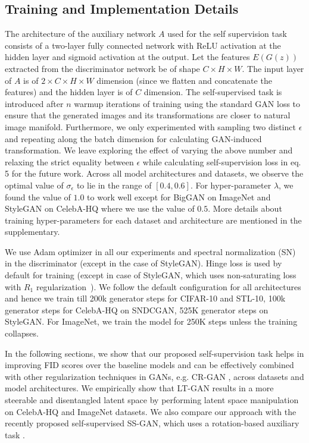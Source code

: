 \documentclass[10pt,twocolumn,letterpaper]{article}
\begin{document}
\subsection{Training and Implementation Details}
The architecture of the auxiliary network $A$ used for the self supervision task consists of a two-layer fully connected network with ReLU activation at the hidden layer and sigmoid activation at the output. Let the features $E(G(z))$ extracted from the discriminator network be of shape $C\times H\times W$. The input layer of $A$ is of $2\times C\times H\times W$ dimension (since we flatten and concatenate the features) and the hidden layer is of $C$ dimension. The self-supervised task is introduced after $n$ warmup iterations of training using the standard GAN loss to ensure that the generated images and its transformations are closer to natural image manifold. Furthermore, we only experimented with sampling two distinct $\epsilon$ and repeating along the batch dimension for calculating GAN-induced transformation. We leave exploring the effect of varying the above number and relaxing the strict equality between $\epsilon$ while calculating self-supervision loss in eq. 5 for the future work. 
Across all model architectures and datasets, we observe the optimal value of $\sigma_\epsilon$ to lie in the range of $[0.4, 0.6]$. For hyper-parameter $\lambda$, we found the value of $1.0$ to work well except for BigGAN on ImageNet and StyleGAN on CelebA-HQ where we use the value of $0.5$. More details about training hyper-parameters for each dataset and architecture are mentioned in the supplementary. 
\par 

We use Adam optimizer in all our experiments and spectral normalization (SN)~\cite{sngan_proj} in the discriminator (except in the case of StyleGAN). Hinge loss is used by default for training (except in case of StyleGAN, which uses non-saturating loss with $R_1$ regularization~\cite{R1_reg}). We follow the default configuration for all architectures and hence we train till 200k generator steps for CIFAR-10 and STL-10, 100k generator steps for CelebA-HQ on SNDCGAN, 525K generator steps on StyleGAN. For ImageNet, we train the model for 250K steps unless the training collapses. 


\par
In the following sections, we show that our proposed self-supervision task helps in improving FID scores over the baseline models and can be effectively combined with other regularization techniques in GANs, e.g. CR-GAN \cite{crgan2019chen}, across datasets and model architectures. We empirically show that LT-GAN results in a more steerable and disentangled latent space by performing latent space manipulation on CelebA-HQ and ImageNet datasets. We also compare our approach with the recently proposed self-supervised SS-GAN, which uses a rotation-based auxiliary task \cite{rot_ssgan2019chen}. 
\end{document}
